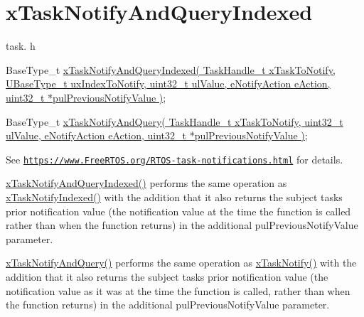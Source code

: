 \hypertarget{group__x_task_notify_and_query_indexed}{}\section{x\+Task\+Notify\+And\+Query\+Indexed}
\label{group__x_task_notify_and_query_indexed}
task. h 
\begin{DoxyPre}BaseType\_t \hyperlink{externals_2freertos_2include_2task_8h_abe38b2577f0de26942659a3a742fb7a4}{xTaskNotifyAndQueryIndexed( TaskHandle\_t xTaskToNotify, UBaseType\_t uxIndexToNotify, uint32\_t ulValue, eNotifyAction eAction, uint32\_t *pulPreviousNotifyValue )};\end{DoxyPre}
 
\begin{DoxyPre}BaseType\_t \hyperlink{externals_2freertos_2include_2task_8h_aaa80adec29a2eebbfe0a551684a0acca}{xTaskNotifyAndQuery( TaskHandle\_t xTaskToNotify, uint32\_t ulValue, eNotifyAction eAction, uint32\_t *pulPreviousNotifyValue )};\end{DoxyPre}


See \href{https://www.FreeRTOS.org/RTOS-task-notifications.html}{\tt https\+://www.\+Free\+R\+T\+O\+S.\+org/\+R\+T\+O\+S-\/task-\/notifications.\+html} for details.

\hyperlink{externals_2freertos_2include_2task_8h_abe38b2577f0de26942659a3a742fb7a4}{x\+Task\+Notify\+And\+Query\+Indexed()} performs the same operation as \hyperlink{externals_2freertos_2include_2task_8h_a0261e3cca34893bdfccbca1be2de93d5}{x\+Task\+Notify\+Indexed()} with the addition that it also returns the subject task\textquotesingle{}s prior notification value (the notification value at the time the function is called rather than when the function returns) in the additional pul\+Previous\+Notify\+Value parameter.

\hyperlink{externals_2freertos_2include_2task_8h_aaa80adec29a2eebbfe0a551684a0acca}{x\+Task\+Notify\+And\+Query()} performs the same operation as \hyperlink{externals_2freertos_2include_2task_8h_a0d2d54fb8a64011dfbb54983e4ed06bd}{x\+Task\+Notify()} with the addition that it also returns the subject task\textquotesingle{}s prior notification value (the notification value as it was at the time the function is called, rather than when the function returns) in the additional pul\+Previous\+Notify\+Value parameter. 